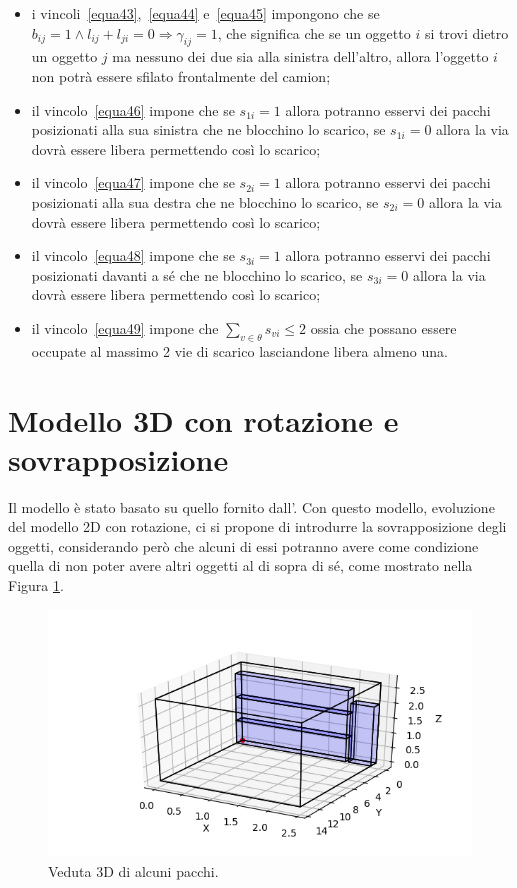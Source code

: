 \begin{itemize}
	\item i vincoli~\eqref{equa43},~\eqref{equa44} e~\eqref{equa45} impongono che se $b_{ij} = 1 \land l_{ij} + l_{ji} = 0 \Rightarrow \gamma_{ij} = 1$, che significa che se un oggetto $i$ si trovi dietro un oggetto $j$ ma nessuno dei due sia alla sinistra dell'altro, allora l'oggetto $i$ non potrà essere sfilato frontalmente del camion;
	\item il vincolo~\eqref{equa46} impone che se $s_{1i} = 1$ allora potranno esservi dei pacchi posizionati alla sua sinistra che ne blocchino lo scarico, se $s_{1i} = 0$ allora la via dovrà essere libera permettendo così lo scarico;
	\item il vincolo~\eqref{equa47} impone che se $s_{2i} = 1$ allora potranno esservi dei pacchi posizionati alla sua destra che ne blocchino lo scarico, se $s_{2i} = 0$ allora la via dovrà essere libera permettendo così lo scarico;
	\item il vincolo~\eqref{equa48} impone che se $s_{3i} = 1$ allora potranno esservi dei pacchi posizionati davanti a sé che ne blocchino lo scarico, se $s_{3i} = 0$ allora la via dovrà essere libera permettendo così lo scarico;
	\item il vincolo~\eqref{equa49} impone che $\sum_{v \in \theta} s_{vi} \leq 2$ ossia che possano essere occupate al massimo 2 vie di scarico lasciandone libera almeno una.
\end{itemize}

\newpage
\section{Modello 3D con rotazione e sovrapposizione}
Il modello è stato basato su quello fornito dall'.
Con questo modello, evoluzione del modello 2D con rotazione, ci si propone di introdurre la sovrapposizione degli oggetti, considerando però che alcuni di essi potranno avere come condizione quella di non poter avere altri oggetti al di sopra di sé, come mostrato nella Figura \ref{fig:3d_grafics}.

\begin{figure}[H]
	\begin{center} \includegraphics[scale=0.7]{figures/3d}
		\caption[Grafico con merci 3D]{Veduta 3D di alcuni pacchi.}
		\label{fig:3d_grafics}
	\end{center}
\end{figure}

